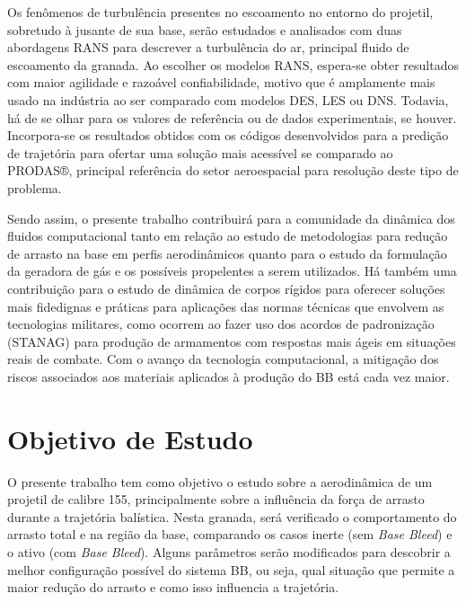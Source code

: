 Os fenômenos de turbulência presentes no escoamento no entorno do projetil, sobretudo à jusante de sua base, serão estudados e analisados com duas abordagens RANS para descrever a turbulência do ar, principal fluido de escoamento da granada. Ao escolher os modelos RANS, espera-se obter resultados com maior agilidade e razoável confiabilidade, motivo que é amplamente mais usado na indústria ao ser comparado com modelos DES, LES ou DNS. Todavia, há de se olhar para os valores de referência ou de dados experimentais, se houver. Incorpora-se os resultados obtidos com os códigos desenvolvidos para a predição de trajetória para ofertar uma solução mais acessível se comparado ao PRODAS®, principal referência do setor aeroespacial para resolução deste tipo de problema.

Sendo assim, o presente trabalho contribuirá para a comunidade da dinâmica dos fluidos computacional tanto em relação ao estudo de metodologias para redução de arrasto na base em perfis aerodinâmicos quanto para o estudo da formulação da geradora de gás e os possíveis propelentes a serem utilizados. Há também uma contribuição para o estudo de dinâmica de corpos rígidos para oferecer soluções mais fidedignas e práticas para aplicações das normas técnicas que envolvem as tecnologias militares, como ocorrem ao fazer uso dos acordos de padronização (STANAG) para produção de armamentos com respostas mais ágeis em situações reais de combate. Com o avanço da tecnologia computacional, a mitigação dos riscos associados aos materiais aplicados à produção do BB está cada vez maior. 

\section{Objetivo de Estudo}

O presente trabalho tem como objetivo o estudo sobre a aerodinâmica de um projetil de calibre \qty{155}{\millimetre}, principalmente sobre a influência da força de arrasto durante a trajetória balística. Nesta granada, será verificado o comportamento do arrasto total e na região da base, comparando os casos inerte (sem \textit{Base Bleed}) e o ativo (com \textit{Base Bleed}). Alguns parâmetros serão modificados para descobrir a melhor configuração possível do sistema BB, ou seja, qual situação que permite a maior redução do arrasto e como isso influencia a trajetória.
	
